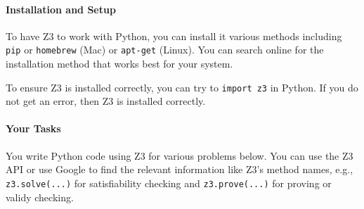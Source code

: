 \documentclass[oneside,11pt,dvipsnames]{book}
\newcommand{\code}[1]{\texttt{#1}}
\begin{document}
\paragraph{Installation and Setup}

To have Z3 to work with Python, you can install it various methods including \texttt{pip} or \texttt{homebrew} (Mac) or \texttt{apt-get} (Linux). You can search online for the installation method that works best for your system.

To ensure Z3 is installed correctly, you can try to \texttt{import z3} in Python. If you do not get an error, then Z3 is installed correctly.

\paragraph{Your Tasks} You write Python code using Z3 for various problems below. You can use the Z3 API or use Google to find the relevant information like Z3's method names, e.g., \code{z3.solve(...)} for satisfiability checking and \code{z3.prove(...)} for proving or validy checking.
\end{document}
